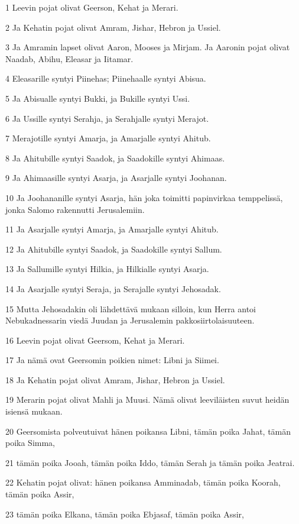 \par 1 Leevin pojat olivat Geerson, Kehat ja Merari.
\par 2 Ja Kehatin pojat olivat Amram, Jishar, Hebron ja Ussiel.
\par 3 Ja Amramin lapset olivat Aaron, Mooses ja Mirjam. Ja Aaronin pojat olivat Naadab, Abihu, Eleasar ja Iitamar.
\par 4 Eleasarille syntyi Piinehas; Piinehaalle syntyi Abisua.
\par 5 Ja Abisualle syntyi Bukki, ja Bukille syntyi Ussi.
\par 6 Ja Ussille syntyi Serahja, ja Serahjalle syntyi Merajot.
\par 7 Merajotille syntyi Amarja, ja Amarjalle syntyi Ahitub.
\par 8 Ja Ahitubille syntyi Saadok, ja Saadokille syntyi Ahimaas.
\par 9 Ja Ahimaasille syntyi Asarja, ja Asarjalle syntyi Joohanan.
\par 10 Ja Joohananille syntyi Asarja, hän joka toimitti papinvirkaa temppelissä, jonka Salomo rakennutti Jerusalemiin.
\par 11 Ja Asarjalle syntyi Amarja, ja Amarjalle syntyi Ahitub.
\par 12 Ja Ahitubille syntyi Saadok, ja Saadokille syntyi Sallum.
\par 13 Ja Sallumille syntyi Hilkia, ja Hilkialle syntyi Asarja.
\par 14 Ja Asarjalle syntyi Seraja, ja Serajalle syntyi Jehosadak.
\par 15 Mutta Jehosadakin oli lähdettävä mukaan silloin, kun Herra antoi Nebukadnessarin viedä Juudan ja Jerusalemin pakkosiirtolaisuuteen.
\par 16 Leevin pojat olivat Geersom, Kehat ja Merari.
\par 17 Ja nämä ovat Geersomin poikien nimet: Libni ja Siimei.
\par 18 Ja Kehatin pojat olivat Amram, Jishar, Hebron ja Ussiel.
\par 19 Merarin pojat olivat Mahli ja Muusi. Nämä olivat leeviläisten suvut heidän isiensä mukaan.
\par 20 Geersomista polveutuivat hänen poikansa Libni, tämän poika Jahat, tämän poika Simma,
\par 21 tämän poika Jooah, tämän poika Iddo, tämän Serah ja tämän poika Jeatrai.
\par 22 Kehatin pojat olivat: hänen poikansa Amminadab, tämän poika Koorah, tämän poika Assir,
\par 23 tämän poika Elkana, tämän poika Ebjasaf, tämän poika Assir,
